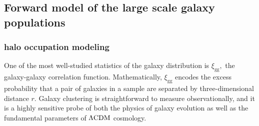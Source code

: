 \documentclass[12pt, preprint]{aastex}
\begin{document}


\subsection{Forward model of the large scale galaxy populations}\label{sec:halo}
\subsubsection{halo occupation modeling}

\newcommand{\lcdm}{\Lambda {\rm CDM}}
\newcommand{\dd}{\mathrm{d}}
\newcommand{\mean}[2]{\left\langle#1 \vert {#2}\right\rangle}

\newcommand{\ngal}{N_{\mathrm{g}}}
\newcommand{\nsat}{N_\mathrm{s}}
\newcommand{\ncen}{N_\mathrm{c}}
\newcommand{\pnm}[2]{P(#1|#2)}

\newcommand{\mhalo}{M_{\rm h}}
\newcommand{\mvir}{M_\mathrm{vir}} 

\newcommand{\dndmvir}{\frac{\dd n}{\dd\mvir}}
\newcommand{\dndmhalo}{\frac{\dd n}{\dd\mhalo}}
\newcommand{\dndmvirprime}{\frac{\dd n}{\dd\mvir'}}

\newcommand{\xigg}{\xi_{\mathrm{gg}}}
\newcommand{\xihh}{\xi_{\mathrm{hh}}}
\newcommand{\xiggr}{\xi_{\mathrm{gg}}(r)}
\newcommand{\xiggroneh}{\xi^{1h}_{\mathrm{gg}}(r)}
\newcommand{\xiggrtwoh}{\xi^{2h}_{\mathrm{gg}}(r)}
\newcommand{\ngalaxy}{\bar{n}_{\mathrm{g}}}

One of the most well-studied statistics of the galaxy distribution 
is $\xigg,$ the galaxy-galaxy correlation function. Mathematically, $\xigg$ encodes the
excess probability that a pair of galaxies in a sample are 
separated by three-dimensional distance $r.$ 
Galaxy clustering is straightforward to measure observationally, 
and it is a highly sensitive probe of both the physics of galaxy evolution 
as well as the fundamental parameters of $\lcdm$ cosmology. 
\end{document}
